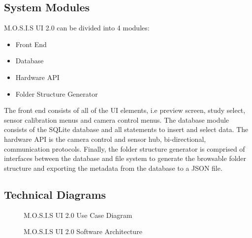 \subsection{System Modules}
M.O.S.I.S UI 2.0 can be divided into 4 modules:
\begin{itemize}
	\item Front End
	\item Database
	\item Hardware API
	\item Folder Structure Generator
\end{itemize}
The front end consists of all of the UI elements, i.e preview screen, study select, sensor calibration menus and camera control menus.\cite{UnifiedModelingLanguage}
The database module consists of the SQLite database and all statements to insert and select data.\cite{kelechavaSQLStandardISO2018}\cite{UnifiedModelingLanguage} The hardware API is the camera control and sensor hub, bi-directional, communication protocols. Finally, the folder structure generator is comprised of interfaces between the database and file system to generate the browsable folder structure and exporting the metadata from the database to a JSON file.\cite{JPEGJPEG}\cite{JSON}
\subsection{Technical Diagrams}
\begin{center}
	\begin{figure}[H]
		\centering
		\caption[]{M.O.S.I.S UI 2.0 Use Case Diagram}
	\end{figure}
	\begin{figure}[H]
		\caption[]{M.O.S.I.S UI 2.0 Software Architecture}
	\end{figure}
\end{center}